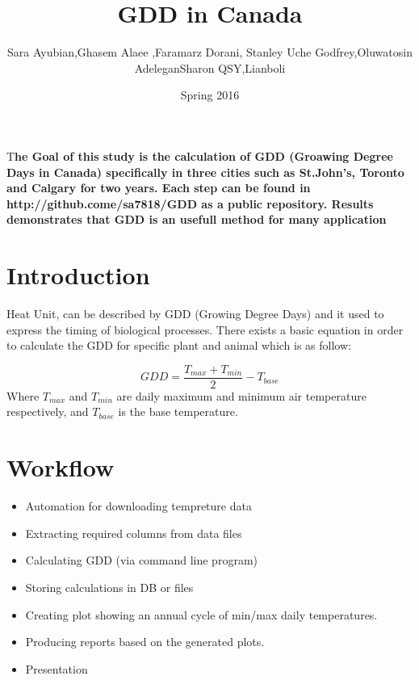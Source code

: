 \documentclass[DIV=calc, paper=a4, fontsize=11pt, twocolumn]{scrartcl}
\title{GDD in Canada}
\author{Sara Ayubian\affmark[1],Ghasem Alaee \affmark[1],Faramarz Dorani\affmark[1],
Stanley Uche Godfrey\affmark[1],Oluwatosin Adelegan\affmark[1]
Sharon QSY\affmark[1],Lianboli\affmark[1]
	}
\date{Spring 2016}
\newcommand{\initial}[1]{ 
\lettrine[lines=3,lhang=0.3,nindent=0em]{
\color{DarkGoldenrod}
{\textsf{#1}}}{}}
\begin{document}
\maketitle %

\thispagestyle{fancy} %


\initial{T}\textbf{he Goal of this study is the calculation of GDD (Groawing Degree Days in Canada) specifically in three cities such as St.John's, Toronto and Calgary for two years. Each step can be found in http://github.come/sa7818/GDD as a public repository. Results demonstrates that GDD is an usefull method for many application}


\section{Introduction}

Heat Unit, can be described by GDD (Growing Degree Days) and it used to express the timing of biological processes. There exists a basic equation in order to calculate the GDD for specific plant and animal which is as follow:


\begin{equation}
GDD =\frac {T_{max}+T_{min}}{2}-T_{base}
\end{equation}
Where $T_{max}$ and $T_{min}$ are daily maximum and minimum air temperature respectively, and $T_{base}$ is the base temperature.




\section{Workflow}

\begin{itemize}
\item Automation for downloading tempreture data
\item Extracting required columns from data files
\item Calculating GDD (via command line program)
\item Storing calculations in DB or files
\item Creating plot showing an annual cycle of min/max daily temperatures.
\item Producing reports based on the generated plots.
\item Presentation
\end{itemize}
\end{document}
